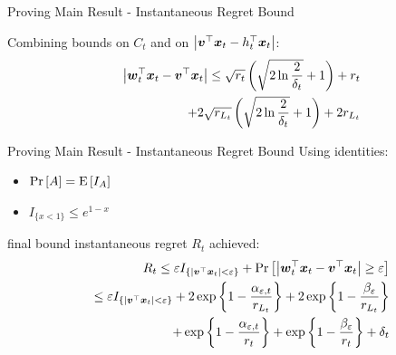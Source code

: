 \documentclass{beamer}
\begin{document}
\begin{frame}{Proving Main Result - Instantaneous Regret Bound}

Combining bounds on $C_t$ and on $\left\vert{{\boldsymbol{v}}}^{\top}{\boldsymbol{x}}_{t}-h_{t}^{\top}{\boldsymbol{x}}_{t}\right\vert$:
\begin{eqnarray*}
&&\left\vert{{\boldsymbol{w}}}^{\top}_{t}{\boldsymbol{x}}_{t}-{{\boldsymbol{v}}}^{\top}{\boldsymbol{x}}_{t}\right\vert\leq\sqrt{r_t}\left(\sqrt{2\ln{\frac{2}{\delta_t}}}+1\right)+r_t\nonumber\\
&&+2\sqrt{r_{L_t}}\left(\sqrt{2\ln{\frac{2}{\delta_t}}}+1\right)+2r_{L_t}
\label{triangl_ht_wt2}
\end{eqnarray*}

\end{frame}


\begin{frame}{Proving Main Result - Instantaneous Regret Bound}
Using identities:\newline
\begin{itemize}
\item ${\rm Pr}\left[{A}\right]={\rm E}\left[{I_A}\right]$
\item $I_{\{x<1\}}\leq e^{1-x}$\newline
\end{itemize}
final bound instantaneous regret $R_t$ achieved:
\begin{eqnarray*}
&&R_t\leq\varepsilon I_{\{\left|{{\boldsymbol{v}}}^{\top}{\boldsymbol{x}}_{t}\right|<\varepsilon\}}+ {\rm Pr}\left[{\left|{{\boldsymbol{w}}}^{\top}_{t}{\boldsymbol{x}}_{t}-{{\boldsymbol{v}}}^{\top}{\boldsymbol{x}}_{t}\right|\geq\varepsilon}\right]\\
&&\leq\varepsilon I_{\{\left|{{\boldsymbol{v}}}^{\top}{\boldsymbol{x}}_{t}\right|<\varepsilon\}}+ 2\exp\left\{1-\frac{\alpha_{\varepsilon,t}}{r_{L_t}}\right\}+2\exp\left\{1-\frac{\beta_{\varepsilon}}{r_{L_t}}\right\}\nonumber\\
&&+\exp\left\{1-\frac{\alpha_{\varepsilon,t}}{r_t}\right\}+\exp\left\{1-\frac{\beta_{\varepsilon}}{r_t}\right\}+\delta_t\nonumber
\label{exponent_regret_class}
\end{eqnarray*}
\end{frame}

\end{document}
